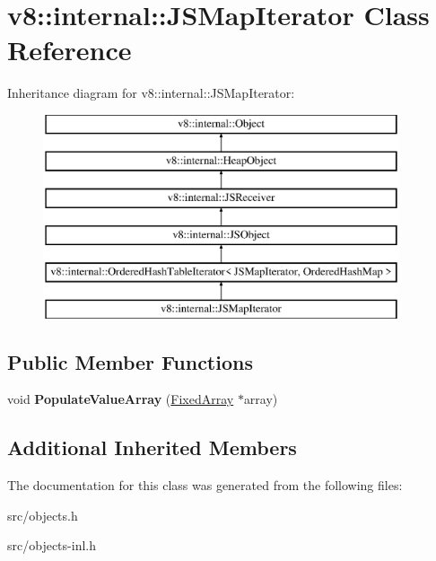 \hypertarget{classv8_1_1internal_1_1_j_s_map_iterator}{}\section{v8\+:\+:internal\+:\+:J\+S\+Map\+Iterator Class Reference}
\label{classv8_1_1internal_1_1_j_s_map_iterator}
Inheritance diagram for v8\+:\+:internal\+:\+:J\+S\+Map\+Iterator\+:\begin{figure}[H]
\begin{center}
\leavevmode
\includegraphics[height=6.000000cm]{classv8_1_1internal_1_1_j_s_map_iterator}
\end{center}
\end{figure}
\subsection*{Public Member Functions}
\begin{DoxyCompactItemize}
\item 
\hypertarget{classv8_1_1internal_1_1_j_s_map_iterator_af507046b68167669ba9f097571987229}{}void {\bfseries Populate\+Value\+Array} (\hyperlink{classv8_1_1internal_1_1_fixed_array}{Fixed\+Array} $\ast$array)\label{classv8_1_1internal_1_1_j_s_map_iterator_af507046b68167669ba9f097571987229}

\end{DoxyCompactItemize}
\subsection*{Additional Inherited Members}


The documentation for this class was generated from the following files\+:\begin{DoxyCompactItemize}
\item 
src/objects.\+h\item 
src/objects-\/inl.\+h\end{DoxyCompactItemize}
